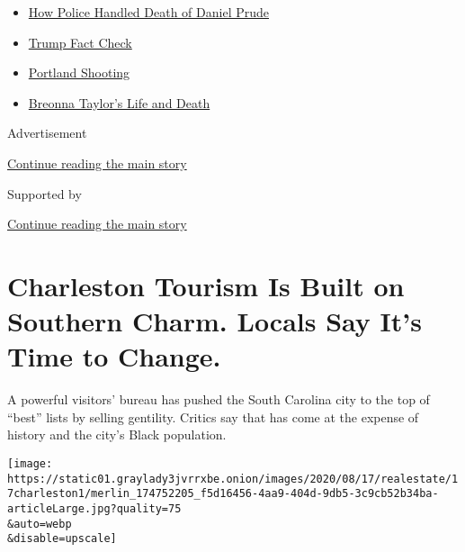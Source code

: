 \begin{itemize}
\tightlist
\item
  \href{https://www.nytimes3xbfgragh.onion/2020/09/04/nyregion/rochester-police-daniel-prude.html?name=styln-george-floyd\&region=TOP_BANNER\&block=storyline_menu_recirc\&action=click\&pgtype=Article\&impression_id=99e870a1-f1c5-11ea-b574-81c26c4f5aee\&variant=undefined}{How
  Police Handled Death of Daniel Prude}
\item
  \href{https://www.nytimes3xbfgragh.onion/2020/09/01/us/politics/trump-fact-check-protests.html?name=styln-george-floyd\&region=TOP_BANNER\&block=storyline_menu_recirc\&action=click\&pgtype=Article\&impression_id=99e897b0-f1c5-11ea-b574-81c26c4f5aee\&variant=undefined}{Trump
  Fact Check}
\item
  \href{https://www.nytimes3xbfgragh.onion/2020/08/30/us/portland-shooting-explained.html?name=styln-george-floyd\&region=TOP_BANNER\&block=storyline_menu_recirc\&action=click\&pgtype=Article\&impression_id=99e897b1-f1c5-11ea-b574-81c26c4f5aee\&variant=undefined}{Portland
  Shooting}
\item
  \href{https://www.nytimes3xbfgragh.onion/2020/08/30/us/breonna-taylor-police-killing.html?name=styln-george-floyd\&region=TOP_BANNER\&block=storyline_menu_recirc\&action=click\&pgtype=Article\&impression_id=99e897b2-f1c5-11ea-b574-81c26c4f5aee\&variant=undefined}{Breonna
  Taylor's Life and Death}
\end{itemize}

Advertisement

\protect\hyperlink{after-top}{Continue reading the main story}

Supported by

\protect\hyperlink{after-sponsor}{Continue reading the main story}

\hypertarget{charleston-tourism-is-built-on-southern-charm-locals-say-its-time-to-change}{%
\section{Charleston Tourism Is Built on Southern Charm. Locals Say It's
Time to
Change.}\label{charleston-tourism-is-built-on-southern-charm-locals-say-its-time-to-change}}

A powerful visitors' bureau has pushed the South Carolina city to the
top of ``best'' lists by selling gentility. Critics say that has come at
the expense of history and the city's Black population.

\texttt{[image: https://static01.graylady3jvrrxbe.onion/images/2020/08/17/realestate/17charleston1/merlin\_174752205\_f5d16456-4aa9-404d-9db5-3c9cb52b34ba-articleLarge.jpg?quality=75\\\&auto=webp\\\&disable=upscale]}

